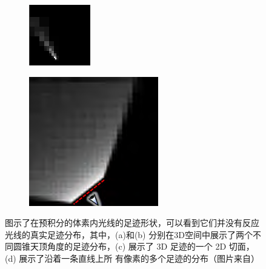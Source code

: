 \begin{figure}
\begin{subfigure}[b]{0.243\textwidth}
		\caption{}
	\end{subfigure}
	\begin{subfigure}[b]{0.243\textwidth}
		\includegraphics[width=\textwidth]{figures/vct/vct-8-3}
		\caption{}
	\end{subfigure}
	\begin{subfigure}[b]{0.243\textwidth}
		\includegraphics[width=\textwidth]{figures/vct/vct-8-4}
		\caption{}
	\end{subfigure}
	\caption{图示了在预积分的体素内光线的足迹形状，可以看到它们并没有反应光线的真实足迹分布，其中，(a)和(b) 分别在3D空间中展示了两个不同圆锥天顶角度的足迹分布，(c) 展示了 3D 足迹的一个 2D 切面，(d) 展示了沿着一条直线上所 有像素的多个足迹的分布（图片来自\cite{a:InteractiveIndirectIlluminationUsingVoxelConeTracing}）}
	\label{f:vct-8}
\end{figure}
